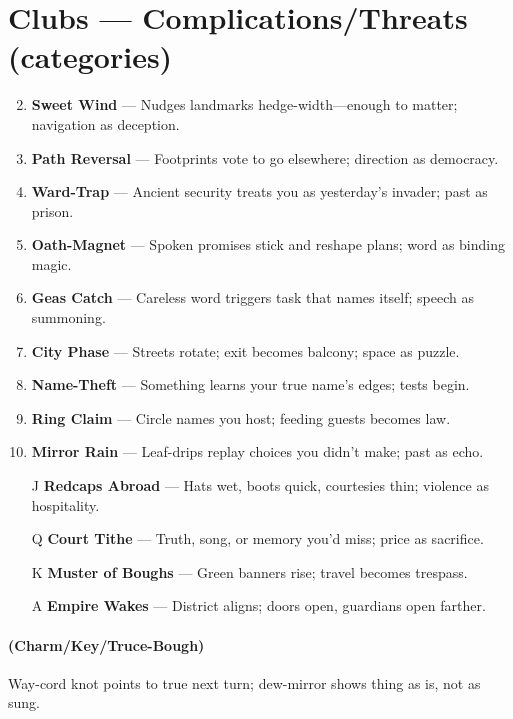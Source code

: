 \section*{Clubs --- Complications/Threats (categories)}
\label{sec:valewood-complications}
\begin{enumerate}
\setcounter{enumi}{1}
\item \textbf{Sweet Wind} --- Nudges landmarks hedge-width---enough to matter; navigation as deception.
\item \textbf{Path Reversal} --- Footprints vote to go elsewhere; direction as democracy.
\item \textbf{Ward-Trap} --- Ancient security treats you as yesterday's invader; past as prison.
\item \textbf{Oath-Magnet} --- Spoken promises stick and reshape plans; word as binding magic.
\item \textbf{Geas Catch} --- Careless word triggers task that names itself; speech as summoning.
\item \textbf{City Phase} --- Streets rotate; exit becomes balcony; space as puzzle.
\item \textbf{Name-Theft} --- Something learns your true name's edges; tests begin.
\item \textbf{Ring Claim} --- Circle names you host; feeding guests becomes law.
\item \textbf{Mirror Rain} --- Leaf-drips replay choices you didn't make; past as echo.
\item[J] \textbf{Redcaps Abroad} --- Hats wet, boots quick, courtesies thin; violence as hospitality.
\item[Q] \textbf{Court Tithe} --- Truth, song, or memory you'd miss; price as sacrifice.
\item[K] \textbf{Muster of Boughs} --- Green banners rise; travel becomes trespass.
\item[A] \textbf{Empire Wakes} --- District aligns; doors open, guardians open farther.
\end{enumerate}

\paragraph*{(Charm/Key/Truce-Bough)} Way-cord knot points to true next turn; dew-mirror shows thing as is, not as sung.

